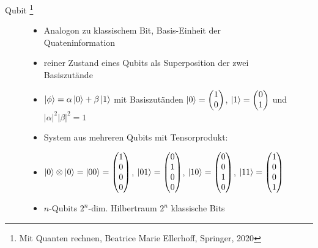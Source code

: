 \documentclass[aspectratio=1610, 9pt]{beamer}
\begin{document}
\begin{frame}{Qubit \footnote[200]{Mit Quanten rechnen, Beatrice Marie Ellerhoff, Springer, 2020}}
  \begin{figure}
    \begin{minipage}{0.49\textwidth}
      \begin{itemize}
        \item Analogon zu klassischem Bit, Basis-Einheit der Quateninformation
        \item reiner Zustand eines Qubits als Superposition der zwei Basiszutände
        \item[] $\ket{\phi} = \alpha \ket{0} + \beta \ket{1} $ mit Basiszutänden $\ket{0} = \begin{pmatrix}1\\0\end{pmatrix}$, $\ket{1} = \begin{pmatrix}0\\1\end{pmatrix}$ und $|\alpha|^2 |\beta|^2 = 1$
        \item System aus mehreren Qubits mit Tensorprodukt:
        \item[] $\ket{0} \otimes \ket{0} = \ket{00} = \begin{pmatrix}1\\0\\0\\0\end{pmatrix}$, $\ket{01} = \begin{pmatrix}0\\1\\0\\0\end{pmatrix}$, $\ket{10} = \begin{pmatrix}0\\0\\1\\0\end{pmatrix}$, $\ket{11} = \begin{pmatrix}1\\0\\0\\1\end{pmatrix}$
        \item $n$-Qubits \rightarrow $2^n$-dim. Hilbertraum \rightarrow $2^n$ klassische Bits
      \end{itemize}
    \end{minipage}
    \hfill
    \begin{minipage}{0.49\textwidth}
      \begin{itemize}

\end{itemize}
\end{minipage}
\end{figure}
\end{frame}
\end{document}
